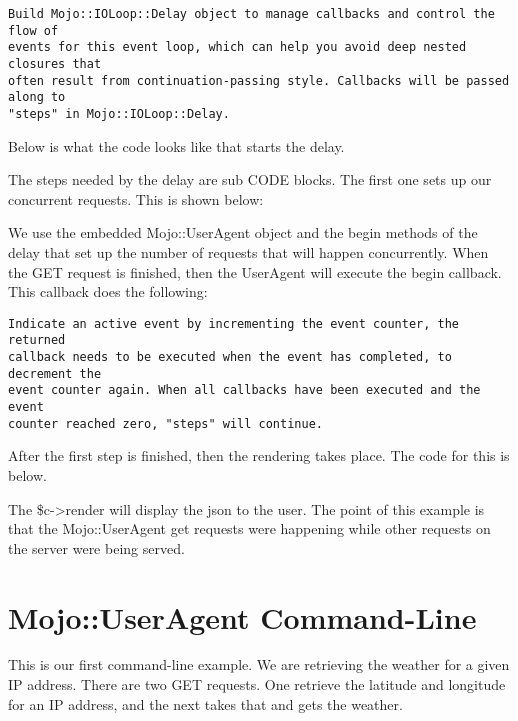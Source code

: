 \documentclass[14pt]{extreport}
\newcommand\Small{\fontsize{12}{13.0}\fontencoding{T1}\selectfont}
\newcommand*\LSTfont{\Small\ttfamily\SetTracking{encoding=*}{-60}\lsstyle}
\begin{document}
\begin{lstlisting}[style=BlockStyle]
Build Mojo::IOLoop::Delay object to manage callbacks and control the flow of
events for this event loop, which can help you avoid deep nested closures that
often result from continuation-passing style. Callbacks will be passed along to
"steps" in Mojo::IOLoop::Delay.
\end{lstlisting}

Below is what the code looks like that starts the delay.



The steps needed by the delay are sub CODE blocks.  The first one sets up our
concurrent requests.  This is shown below:



We use the embedded Mojo::UserAgent object and the begin methods of the delay
that set up the number of requests that will happen concurrently.  When the GET
request is finished, then the UserAgent will execute the begin callback.  This
callback does the following:

\begin{lstlisting}[style=BlockStyle]
Indicate an active event by incrementing the event counter, the returned
callback needs to be executed when the event has completed, to decrement the
event counter again. When all callbacks have been executed and the event
counter reached zero, "steps" will continue.
\end{lstlisting}

After the first step is finished, then the rendering takes place.  The code for
this is below.



The \$c->render will display the json to the user.  The point of this example
is that the Mojo::UserAgent get requests were happening while other requests on
the server were being served.

\section{Mojo::UserAgent Command-Line}

This is our first command-line example.  We are retrieving the weather for a
given IP address.  There are two GET requests.  One retrieve the latitude and
longitude for an IP address, and the next takes that and gets the weather.
\end{document}
